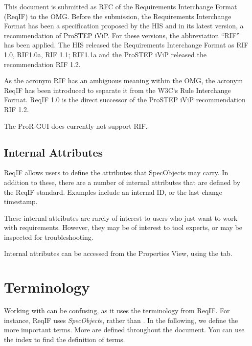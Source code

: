 This document is submitted as RFC of the Requirements Interchange Format (ReqIF) to the OMG.  Before the submission, the Requirements Interchange Format has been a specification proposed by the HIS and in its latest version, a recommendation of ProSTEP iViP.  For these versions, the abbreviation ``RIF'' has been applied.  The HIS released the Requirements Interchange Format as RIF 1.0, RIF1.0a, RIF 1.1; RIF1.1a and the ProSTEP iViP released the recommendation RIF 1.2.

As the acronym RIF has an ambiguous meaning within the OMG, the acronym ReqIF has been introduced to separate it from the W3C`s Rule Interchange Format.  ReqIF 1.0 is the direct successor of the ProSTEP iViP recommendation RIF 1.2.

\begin{warning}
The ProR GUI does currently not support RIF.
\end{warning}

\subsection{Internal Attributes}
\label{sec:reqif_internal_attributes}

ReqIF allows users to define the attributes that SpecObjects may carry.  In addition to these, there are a number of internal attributes that are defined by the ReqIF standard.  Examples include an internal ID, or the last change timestamp.

These internal attributes are rarely of interest to users who just want to work with requirements.  However, they may be of interest to tool experts, or may be inspected for troubleshooting.

Internal attributes can be accessed from the Properties View, using the  tab.

\section{Terminology}
\label{sec:terminology}

Working with \pror{} can be confusing, as it uses the terminology from ReqIF.  For instance, ReqIF uses \textit{SpecObject}s, rather than .  In the following, we define the more important terms.  More are defined throughout the document.  You can use the index to find the definition of terms.

